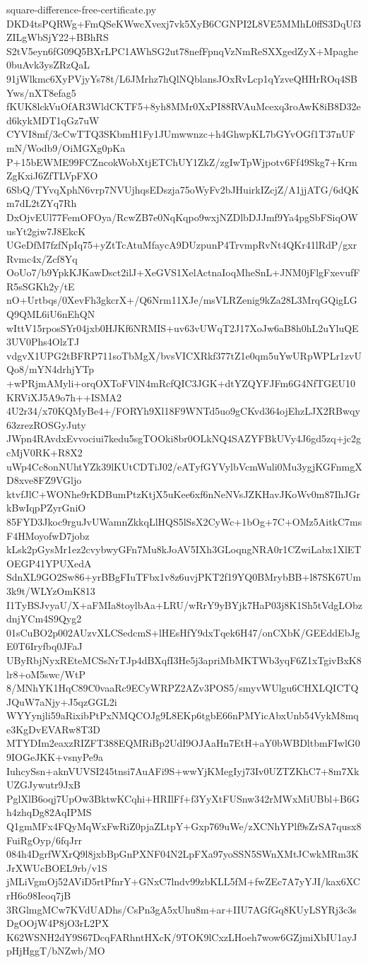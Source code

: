 \documentclass[11pt]{article}
\theoremstyle{definition}
\theoremstyle{remark}
\begin{document}
\begin{filecontents*}[overwrite]{square-difference-free-certificate.py}
DKD4tsPQRWg+FmQSeKWwcXvexj7vk5XyB6CGNPI2L8VE5MMhL0ffS3DqUf3ZILgWbSjY22+BBhRS
S2tV5eyn6fG09Q5BXrLPC1AWhSG2ut78nefFpnqVzNmReSXXgedZyX+Mpaghe0buAvk3ysZRzQaL
91jWlkmc6XyPVjyYs78t/L6JMrhz7hQlNQblansJOxRvLcp1qYzveQHHrROq4SBYws/nXT8efag5
fKUK8lckVuOfAR3WldCKTF5+8yh8MMr0XxPI88RVAuMcexq3roAwK8iB8D32ed6kykMDT1qGz7uW
CYVI8mf/3cCwTTQ3SKbmH1Fy1JUmwwnzc+h4GhwpKL7bGYvOGf1T37nUFmN/Wodb9/OiMGXg0pKa
P+15bEWME99FCZncokWobXtjETChUY1ZkZ/zgIwTpWjpotv6Ff49Skg7+KrmZgKxiJ6ZfTLVpFXO
6SbQ/TYvqXphN6vrp7NVUjhqsEDszja75oWyFv2bJHuirkIZcjZ/A1jjATG/6dQKm7dL2tZYq7Rh
DxOjvEUl77FemOFOya/RcwZB7e0NqKqpo9wxjNZDlbDJJmf9Ya4pgSbFSiqOWusYt2giw7J8EkcK
UGeDfM7fzfNpIq75+yZtTcAtuMfaycA9DUzpunP4TrvmpRvNt4QKr41lRdP/gxrRvmc4x/Zcf8Yq
OoUo7/b9YpkKJKawDsct2ilJ+XeGVS1XelActnaIoqMheSnL+JNM0jFlgFxevufFR5sSGKh2y/tE
nO+Urtbqs/0XevFh3gkcrX+/Q6Nrm11XJe/msVLRZenig9kZa28L3MrqGQigLGQ9QML6iU6nEhQN
wIttV15rposSYr04jxb0HJKf6NRMIS+uv63vUWqT2J17XoJw6aB8h0hL2uYluQE3UV0Phs4OlzTJ
vdgvX1UPG2tBFRP711soTbMgX/bvsVICXRkf377tZ1e0qm5uYwURpWPLr1zvUQo8/mYN4drhjYTp
+wPRjmAMyli+orqOXToFVlN4mRcfQIC3JGK+dtYZQYFJFm6G4NfTGEU10KRViXJ5A9o7h++ISMA2
4U2r34/x70KQMyBe4+/FORYh9Xl18F9WNTd5uo9gCKvd364ojEhzLJX2RBwqy63zrezROSGyJuty
JWpn4RAvdxEvvociui7kedu5sgTOOki8br0OLkNQ4SAZYFBkUVy4J6gd5zq+jc2gcMjV0RK+R8X2
uWp4Cc8onNUhtYZk39lKUtCDTiJ02/eATyfGYVylbVcmWuli0Mu3ygjKGFnmgXD8xve8FZ9VGljo
ktvfJlC+WONhe9rKDBumPtzKtjX5uKee6xf6nNeNVsJZKHavJKoWv0m87IhJGrkBwIqpPZyrGniO
85FYD3Jkoc9rguJvUWamnZkkqLlHQS5lSsX2CyWc+1bOg+7C+OMz5AitkC7msF4HMoyofwD7jobz
kLsk2pGysMr1ez2cvybwyGFn7Mu8kJoAV5IXh3GLoqngNRA0r1CZwiLabx1XlETOEGP41YPUXedA
SdnXL9GO2Sw86+yrBBgFIuTFbx1v8z6uvjPKT2f19YQ0BMrybBB+l87SK67Um3k9t/WLYzOmK813
I1TyBSJvyaU/X+aFMIa8toylbAa+LRU/wRrY9yBYjk7HaP03j8K1Sh5tVdgLObzdnjYCm4S9Qyg2
01sCuBO2p002AUzvXLCSedcmS+lHEsHfY9dxTqek6H47/onCXbK/GEEddEbJgE0T6Iryfbq0JFaJ
UByRbjNyxREteMCSsNrTJp4dBXqfI3He5j3apriMbMKTWb3yqF6Z1xTgivBxK8lr8+oM5swc/WtP
8/MNhYK1HqC89C0vaaRc9ECyWRPZ2AZv3POS5/smyvWUlgu6CHXLQICTQJQuW7aNjy+J5qzGGL2i
WYYynjli59aRixibPtPxNMQCOJg9L8EKp6tgbE66nPMYicAbxUnb54VykM8mqe3KgDvEVARw8T3D
MTYDIm2eaxzRIZFT388EQMRiBp2UdI9OJAaHn7EtH+aY0bWBDltbmFIwlG09IOGeJKK+vsnyPe9a
IuhcySsn+aknVUVSI245tnsi7AuAFi9S+wwYjKMegIyj73Iv0UZTZKhC7+8m7XkUZGJywutr9JxB
PglXlB6oqj7UpOw3BktwKCqhi+HRIlFf+f3YyXtFUSnw342rMWxMiUBbl+B6Gh4zhqDg82AqIPMS
Q1gmMFx4FQyMqWxFwRiZ0pjaZLtpY+Gxp769uWe/zXCNhYPlf9sZrSA7qusx8FuiRgOyp/6fqJrr
084h4DgrfWXrQ9l8jxbBpGnPXNF04N2LpFXa97yoSSN5SWnXMtJCwkMRm3KJrXWUcBOEL9rb/v1S
jMLiVgmOj52AViD5rtPfnrY+GNxC7lndv99zbKLL5fM+fwZEc7A7yYJI/kax6XCrH6o98Ieoq7jB
3RGlmgMCw7KVdUADhs/CsPn3gA5xUhu8m+ar+IIU7AGfGq8KUyLSYRj3c3sDgOOjW4P8jO3rL2PX
K62WSNH2dY9S67DcqFARhntHXcK/9TOK9lCxzLHoeh7wow6GZjmiXbIU1ayJpHjHggT/bNZwb/MO

\end{filecontents*}
\end{document}
